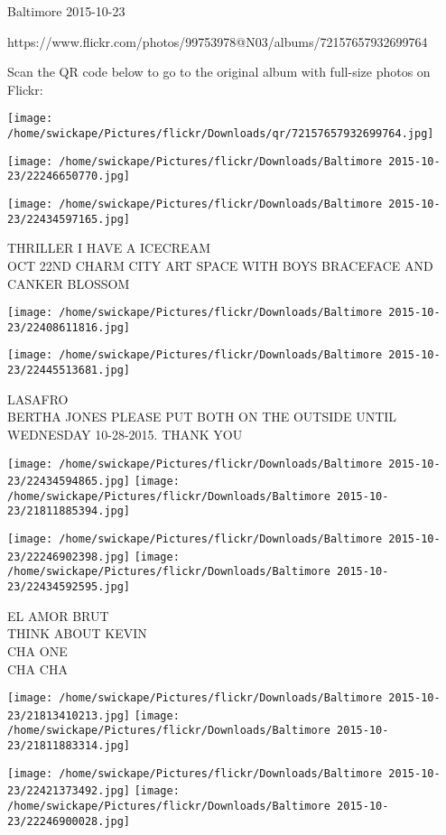 \documentclass[10pt,letterpaper]{article}
\begin{document}
Baltimore 2015-10-23

https://www.flickr.com/photos/99753978@N03/albums/72157657932699764

Scan the QR code below to go to the original album with full-size photos on Flickr:

\texttt{[image: /home/swickape/Pictures/flickr/Downloads/qr/72157657932699764.jpg]}
\pagebreak

\texttt{[image: /home/swickape/Pictures/flickr/Downloads/Baltimore 2015-10-23/22246650770.jpg]}

\vspace{0.25in}
\texttt{[image: /home/swickape/Pictures/flickr/Downloads/Baltimore 2015-10-23/22434597165.jpg]}

THRILLER I HAVE A ICECREAM\\
OCT 22ND CHARM CITY ART SPACE WITH BOYS BRACEFACE AND CANKER BLOSSOM
\pagebreak

\texttt{[image: /home/swickape/Pictures/flickr/Downloads/Baltimore 2015-10-23/22408611816.jpg]}

\vspace{0.25in}
\texttt{[image: /home/swickape/Pictures/flickr/Downloads/Baltimore 2015-10-23/22445513681.jpg]}

LASAFRO\\
BERTHA JONES PLEASE PUT BOTH ON THE OUTSIDE UNTIL WEDNESDAY 10{-}28{-}2015.  THANK YOU
\pagebreak

\texttt{[image: /home/swickape/Pictures/flickr/Downloads/Baltimore 2015-10-23/22434594865.jpg]}
\texttt{[image: /home/swickape/Pictures/flickr/Downloads/Baltimore 2015-10-23/21811885394.jpg]}

\texttt{[image: /home/swickape/Pictures/flickr/Downloads/Baltimore 2015-10-23/22246902398.jpg]}
\texttt{[image: /home/swickape/Pictures/flickr/Downloads/Baltimore 2015-10-23/22434592595.jpg]}

EL AMOR BRUT\\
THINK ABOUT KEVIN\\
CHA ONE\\
CHA CHA
\pagebreak

\texttt{[image: /home/swickape/Pictures/flickr/Downloads/Baltimore 2015-10-23/21813410213.jpg]}
\texttt{[image: /home/swickape/Pictures/flickr/Downloads/Baltimore 2015-10-23/21811883314.jpg]}

\texttt{[image: /home/swickape/Pictures/flickr/Downloads/Baltimore 2015-10-23/22421373492.jpg]}
\texttt{[image: /home/swickape/Pictures/flickr/Downloads/Baltimore 2015-10-23/22246900028.jpg]}
\end{document}
